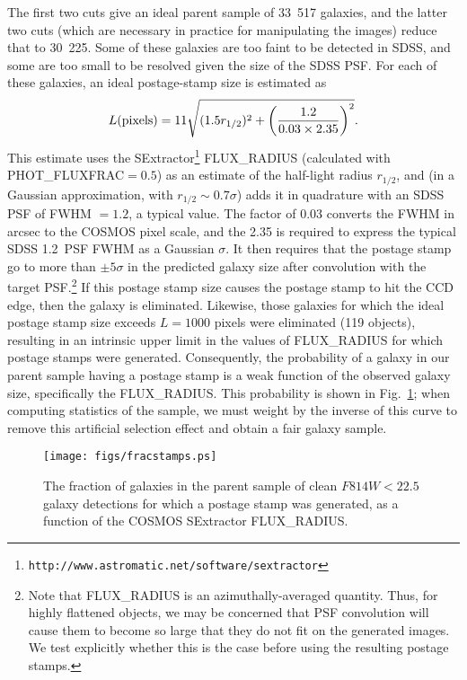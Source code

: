 \documentclass[twocolumn,useAMS,usenatbib]{mn2e}
\newcommand{\beq}{\begin{equation}}
\newcommand{\eeq}{\end{equation}}
\newcommand{\newtext}{}
\begin{document}
The first two cuts give an ideal parent sample of 33~517 galaxies, and
the latter two cuts (which are necessary in practice for manipulating
the images) reduce that to 30~225. Some of these galaxies
are too faint to be detected in SDSS, and some are too small to be
resolved given the size of the SDSS PSF.  For each of these galaxies,
an ideal postage-stamp size is estimated as 
\beq
L {\rm (pixels)} = 11 \sqrt{(1.5 r_{1/2})^2 + \left(\frac{1.2}{0.03
      \times 2.35}\right)^2}.
\eeq
This estimate uses the SExtractor\footnote{\texttt{http://www.astromatic.net/software/sextractor}} \citep{1996A&AS..117..393B} FLUX\_RADIUS (calculated with
PHOT\_FLUXFRAC$=0.5$) as an estimate of the
half-light radius $r_{1/2}$, and (\newtext{in a Gaussian approximation, with
$r_{1/2}\sim 0.7\sigma$}) adds it
in quadrature with an SDSS PSF of FWHM $=1.2$\arcsec, a typical
value. The factor of 0.03 converts the FWHM in arcsec to the COSMOS
pixel scale, and the 2.35 is required to express \newtext{the
  typical SDSS 1.2\arcsec\ PSF FWHM as a Gaussian $\sigma$}. It
then requires that the postage stamp go to more than $\pm 5\sigma$ in
the predicted galaxy size after convolution with the target
PSF.\footnote{Note that FLUX\_RADIUS is an azimuthally-averaged
  quantity.  Thus, for highly flattened objects, we may be concerned
  that PSF convolution will cause them to become so large that they do
  not fit on the generated images.  We test explicitly whether
  this is the case before using the resulting postage
  stamps.}  If this postage stamp size causes the
postage stamp to hit the CCD edge, then the galaxy is eliminated.
Likewise, those galaxies for which the ideal postage stamp size
exceeds 
$L=1000$ pixels were eliminated (119 objects), resulting in an
intrinsic upper limit in the values of FLUX\_RADIUS for which postage
stamps were generated.  
Consequently, the probability of a galaxy in our
parent sample having a postage stamp is a weak function of the observed
galaxy size, specifically the FLUX\_RADIUS.  This probability is shown
in Fig.~\ref{F:fracstamps}; when computing statistics of the sample,
we must weight by the inverse of this curve to remove this artificial
selection effect and obtain a
fair galaxy sample.
\begin{figure}
\begin{center}
\texttt{[image: figs/fracstamps.ps]}
\caption{\label{F:fracstamps}The fraction of galaxies in the parent
  sample of clean $F814W<22.5$ galaxy detections for which a postage
  stamp was generated, as a function of the COSMOS SExtractor
  FLUX\_RADIUS.}
\end{center}
\end{figure}
\end{document}

